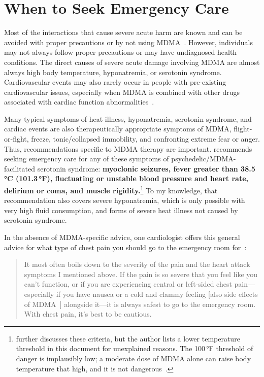 \documentclass[11pt,oneside]{book}
\let\cite\parencite
\begin{document}
\section{When to Seek Emergency Care}
Most of the interactions that cause severe acute harm are known and can be avoided with proper precautions or by not using MDMA~\cite{riggDeaths,malcolmSerotonin}. However, individuals may not always follow proper precautions or may have undiagnosed health conditions. The direct causes of severe acute damage involving MDMA are almost always high body temperature, hyponatremia, or serotonin syndrome. Cardiovascular events may also rarely occur in people with pre-existing cardiovascular issues, especially when MDMA is combined with other drugs associated with cardiac function abnormalities~\cite{makunts2023concomitant}.

Many typical symptoms of heat illness, hyponatremia, serotonin syndrome, and cardiac events are also therapeutically appropriate symptoms of MDMA, flight-or-fight, freeze, tonic/collapsed immobility, and confronting extreme fear or anger. Thus, recommendations specific to MDMA therapy are important. \textcite{malcolmAyahuasca} recommends seeking emergency care for any of these symptoms of psychedelic/MDMA-facilitated serotonin syndrome: \textbf{myoclonic seizures, fever greater than 38.5\,°C (101.3\,°F), fluctuating or unstable blood pressure and heart rate, delirium or coma, and muscle rigidity.}\footnote{\textcite{malcolmER} further discusses these criteria, but the author lists a lower temperature threshold in this document for unexplained reasons. The 100\,°F threshold of danger is implausibly low; a moderate dose of MDMA alone can raise body temperature that high, and it is not dangerous~\cite{liechtiTemperature}.} To my knowledge, that recommendation also covers severe hyponatremia, which is only possible with very high fluid consumption, and forms of severe heat illness not caused by serotonin syndrome.

In the absence of MDMA-specific advice, one cardiologist offers this general advice for what type of chest pain you should go to the emergency room for~\cite{chestPain}: 
\begin{quotation}
    It most often boils down to the severity of the pain and the heart attack symptoms I mentioned above. If the pain is so severe that you feel like you can't function, or if you are experiencing central or left-sided chest pain---especially if you have nausea or a cold and clammy feeling [also side effects of MDMA~\cite{liechtiGender}] alongside it---it is always safest to go to the emergency room. With chest pain, it's best to be cautious.
\end{quotation}
\end{document}
